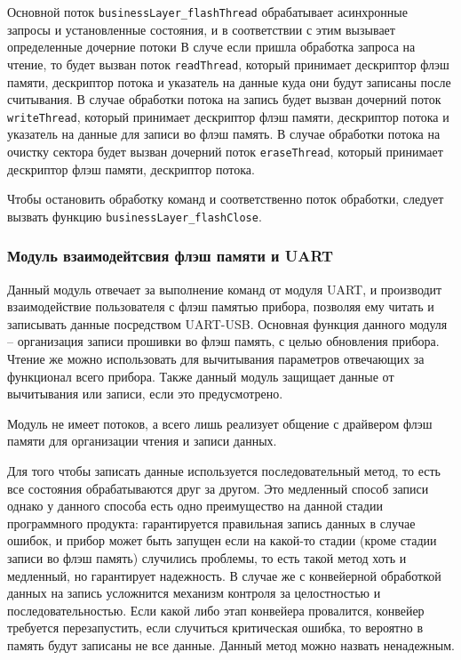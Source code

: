 Основной поток \lstinline|businessLayer_flashThread| обрабатывает асинхронные запросы и установленные состояния, и в соответствии с этим вызывает определенные дочерние потоки
В случе если пришла обработка запроса на чтение, то будет вызван поток \lstinline|readThread|, который принимает дескриптор флэш памяти, дескриптор потока и указатель на
данные куда они будут записаны после считывания.
В случае обработки потока на запись будет вызван дочерний поток \lstinline|writeThread|, который принимает дескриптор флэш памяти, дескриптор потока и указатель на
данные для записи во флэш память.
В случае обработки потока на очистку сектора будет вызван дочерний поток \lstinline|eraseThread|, который принимает дескриптор флэш памяти, дескриптор потока.

Чтобы остановить обработку команд и соответственно поток обработки, следует вызвать функцию \lstinline|businessLayer_flashClose|.


\subsubsection{Модуль взаимодейтсвия флэш памяти и UART}

Данный модуль отвечает за выполнение команд от модуля UART, и производит взаимодействие пользователя с флэш памятью прибора, позволяя ему читать и записывать данные
посредством UART-USB. Основная функция данного модуля -- организация записи прошивки во флэш память, с целью обновления прибора. Чтение же можно использовать для
вычитывания параметров отвечающих за функционал всего прибора.  Также данный модуль защищает данные от вычитывания или записи, если это предусмотрено. 

Модуль не имеет потоков, а всего лишь реализует общение с драйвером флэш памяти для организации чтения и записи данных. 

Для того чтобы записать данные используется последовательный метод, то есть все состояния обрабатываются друг за другом. Это медленный способ записи
однако у данного способа есть одно преимущество на данной стадии программного продукта: гарантируется правильная запись данных в случае ошибок, и прибор может
быть запущен если на какой-то стадии (кроме стадии записи во флэш память) случились проблемы, то есть такой метод хоть и медленный, но гарантирует надежность.
В случае же с конвейерной обработкой данных на запись усложнится механизм контроля за целостностью и последовательностью. 
Если какой либо этап конвейера провалится, конвейер требуется перезапустить, если случиться критическая ошибка, то вероятно в память будут записаны не все данные.
Данный метод можно назвать ненадежным. 

